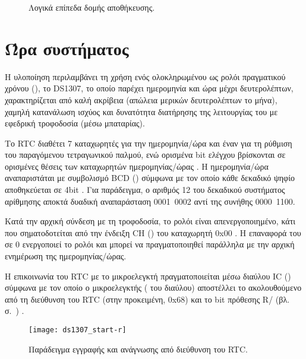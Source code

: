 \begin{figure}
    \caption{Λογικά επίπεδα δομής αποθήκευσης.\label{fig:log:structure}}
\begin{center}%
    \def\svgwidth{0.7\textwidth}
    
\end{center}
\end{figure}


\section{Ώρα συστήματος}

Η υλοποίηση περιλαμβάνει τη χρήση ενός ολοκληρωμένου ως ρολόι πραγματικού χρόνου
(), το DS1307, το οποίο παρέχει ημερομηνία και ώρα
μέχρι δευτερολέπτων, χαρακτηρίζεται από καλή ακρίβεια (απώλεια μερικών
δευτερολέπτων το μήνα), χαμηλή κατανάλωση ισχύος και δυνατότητα διατήρησης της
λειτουργίας του με εφεδρική τροφοδοσία (μέσω μπαταρίας).

Το RTC διαθέτει 7 καταχωρητές για την ημερομηνία\slash{}ώρα και έναν για τη
ρύθμιση του παραγόμενου τετραγωνικού παλμού, ενώ ορισμένα bit ελέγχου βρίσκονται
σε ορισμένες θέσεις των καταχωρητών ημερομηνίας\slash{}ώρας
\parencite[8]{ds1307}. Η ημερομηνία\slash{}ώρα
αναπαριστάται με συμβολισμό BCD () σύμφωνα με
τον οποίο κάθε δεκαδικό ψηφίο αποθηκεύεται σε 4bit \parencite[8]{ds1307}.
Για παράδειγμα, ο αριθμός 12 του δεκαδικού συστήματος αρίθμησης αποκτά δυαδική
αναπαράσταση 0001~0002 αντί της συνήθης 0000~1100.


Κατά την αρχική σύνδεση με τη τροφοδοσία, το ρολόι είναι απενεργοποιημένο, κάτι
που σηματοδοτείται από την ένδειξη CH () του καταχωρητή 0x00
\parencite[8]{ds1307}. Η επαναφορά του σε 0 ενεργοποιεί το ρολόι και μπορεί να
πραγματοποιηθεί παράλληλα με την αρχική ενημέρωση της ημερομηνίας\slash{}ώρας.

Η επικοινωνία του RTC με το μικροελεγκτή πραγματοποιείται μέσω διαύλου
IC () σύμφωνα με τον οποίο ο μικροελεγκτής
( του διαύλου) αποστέλλει το  ακολουθούμενο από τη
διεύθυνση του RTC (στην προκειμένη, 0x68) και το bit πρόθεσης R\slash{}
(βλ.  σ.~\pageref{subsec:i2c}) \parencite[1,10]{ds1307}.

\begin{figure}
    \caption{Παράδειγμα εγγραφής και ανάγνωσης από διεύθυνση του RTC.
    \label{fig:rtc:start-r}}
    \begin{center}
    \texttt{[image: ds1307\_start-r]}
    \end{center}
\end{figure}

